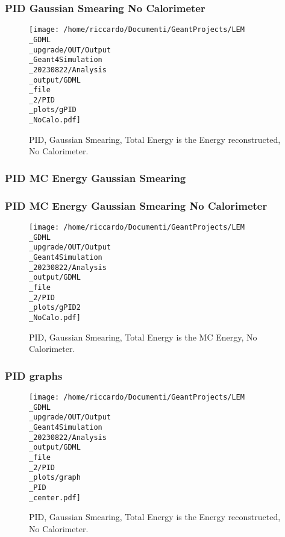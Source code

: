 \documentclass[8pt]{beamer}
\begin{document}
            \begin{frame}
                \frametitle{PID Gaussian Smearing No Calorimeter}
            
        \begin{figure}[h]
            \centering
            \texttt{[image: /home/riccardo/Documenti/GeantProjects/LEM\\\_GDML\\\_upgrade/OUT/Output\\\_Geant4Simulation\\\_20230822/Analysis\\\_output/GDML\\\_file\\\_2/PID\\\_plots/gPID\\\_NoCalo.pdf]}
            \caption{PID, Gaussian Smearing, Total Energy is the Energy reconstructed, No Calorimeter.}
        \end{figure}
        
            \end{frame}
            
            \begin{frame}
                \frametitle{PID MC Energy Gaussian Smearing}
            
            \end{frame}
            
            \begin{frame}
                \frametitle{PID MC Energy Gaussian Smearing No Calorimeter}
            
        \begin{figure}[h]
            \centering
            \texttt{[image: /home/riccardo/Documenti/GeantProjects/LEM\\\_GDML\\\_upgrade/OUT/Output\\\_Geant4Simulation\\\_20230822/Analysis\\\_output/GDML\\\_file\\\_2/PID\\\_plots/gPID2\\\_NoCalo.pdf]}
            \caption{PID, Gaussian Smearing, Total Energy is the MC Energy, No Calorimeter.}
        \end{figure}
        
            \end{frame}
            
            \begin{frame}
                \frametitle{PID graphs}
            
        \begin{figure}[h]
            \centering
            \texttt{[image: /home/riccardo/Documenti/GeantProjects/LEM\\\_GDML\\\_upgrade/OUT/Output\\\_Geant4Simulation\\\_20230822/Analysis\\\_output/GDML\\\_file\\\_2/PID\\\_plots/graph\\\_PID\\\_center.pdf]}
            \caption{PID, Gaussian Smearing, Total Energy is the Energy reconstructed, No Calorimeter.}
        \end{figure}
        
            \end{frame}
            
\end{document}
